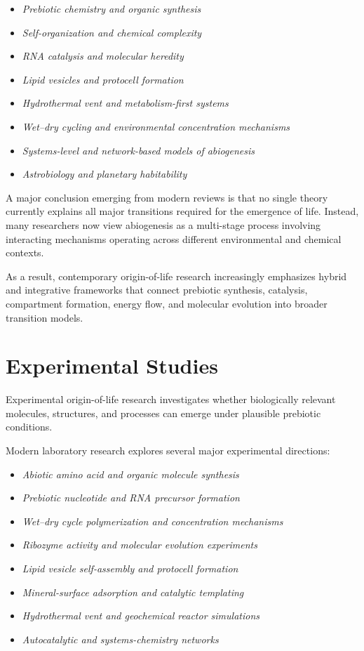 \documentclass[
  oneside]{book}
\providecommand{\tightlist}{%
  \setlength{\itemsep}{0pt}\setlength{\parskip}{0pt}}
\begin{document}
\begin{itemize}
\tightlist
\item
  \emph{Prebiotic chemistry and organic synthesis}
\item
  \emph{Self-organization and chemical complexity}
\item
  \emph{RNA catalysis and molecular heredity}
\item
  \emph{Lipid vesicles and protocell formation}
\item
  \emph{Hydrothermal vent and metabolism-first systems}
\item
  \emph{Wet--dry cycling and environmental concentration mechanisms}
\item
  \emph{Systems-level and network-based models of abiogenesis}
\item
  \emph{Astrobiology and planetary habitability}
\end{itemize}

A major conclusion emerging from modern reviews is that no single theory currently explains all major transitions required for the emergence of life. Instead, many researchers now view abiogenesis as a multi-stage process involving interacting mechanisms operating across different environmental and chemical contexts.

As a result, contemporary origin-of-life research increasingly emphasizes hybrid and integrative frameworks that connect prebiotic synthesis, catalysis, compartment formation, energy flow, and molecular evolution into broader transition models.

\section{Experimental Studies}\label{experimental-studies}

Experimental origin-of-life research investigates whether biologically relevant molecules, structures, and processes can emerge under plausible prebiotic conditions.

Modern laboratory research explores several major experimental directions:

\begin{itemize}
\tightlist
\item
  \emph{Abiotic amino acid and organic molecule synthesis}
\item
  \emph{Prebiotic nucleotide and RNA precursor formation}
\item
  \emph{Wet--dry cycle polymerization and concentration mechanisms}
\item
  \emph{Ribozyme activity and molecular evolution experiments}
\item
  \emph{Lipid vesicle self-assembly and protocell formation}
\item
  \emph{Mineral-surface adsorption and catalytic templating}
\item
  \emph{Hydrothermal vent and geochemical reactor simulations}
\item
  \emph{Autocatalytic and systems-chemistry networks}
\end{itemize}
\end{document}
